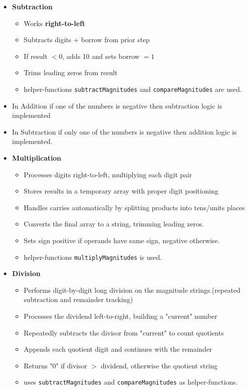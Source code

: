 \documentclass[12pt]{article}
\begin{document}
\begin{spacing}{1.2}
\begin{itemize}[leftmargin=*]
    \item \textbf{Subtraction}
    \begin{itemize}
        \item Works \textbf{right-to-left}
        \item Subtracts digits + borrow from prior step
        \item If result $< 0$, adds 10 and sets borrow $= 1$
        \item Trims leading zeros from result
        \item helper-functions \texttt{subtractMagnitudes} and \texttt{compareMagnitudes} are used.
    \end{itemize}
    \item In Addition if one of the numbers is negative then subtraction logic is implemented
    \item In Subtraction if only one of the numbers is negative then addition logic is implemented.

    \item \textbf{Multiplication}
    \begin{itemize}
        \item Processes digits right-to-left, multiplying each digit pair
        \item Stores results in a temporary array with proper digit positioning
        \item Handles carries automatically by splitting products into tens/units places
        \item Converts the final array to a string, trimming leading zeros.
        \item Sets sign positive if operands have same sign, negative otherwise.
        \item helper-functions \texttt{multiplyMagnitudes} is used.
    \end{itemize}

    \item \textbf{Division}
    \begin{itemize}
        \item Performs digit-by-digit long division on the magnitude strings.(repeated subtraction and remainder tracking)
        \item Processes the dividend left-to-right, building a "current" number
        \item Repeatedly subtracts the divisor from "current" to count quotients
        \item Appends each quotient digit and continues with the remainder
        \item Returns "0" if divisor $>$ dividend, otherwise the quotient string
        \item uses \texttt{subtractMagnitudes} and \texttt{compareMagnitudes} as helper-functions.
    \end{itemize}
    

\end{itemize}
\end{spacing}
\end{document}
